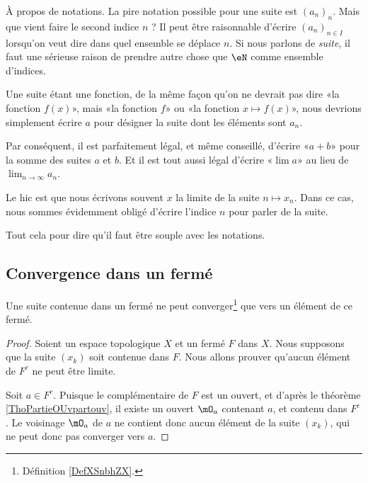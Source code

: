 \begin{normaltext}
	À propos de notations. La pire notation possible pour une suite est \( (a_n)_n\). Mais que vient faire le second indice \( n\) ? Il peut être raisonnable d'écrire \( (a_n)_{n\in I}\) lorsqu'on veut dire dans quel ensemble se déplace \( n\). Si nous parlons de \emph{suite}, il faut une sérieuse raison de prendre autre chose que \( \eN\) comme ensemble d'indices.

	Une suite étant une fonction, de la même façon qu'on ne devrait pas dire «la fonction \( f(x)\)», mais «la fonction \( f\)» ou «la fonction \( x\mapsto f(x)\)», nous devrions simplement écrire \( a\) pour désigner la suite dont les éléments sont \( a_n\).

	Par conséquent, il est parfaitement légal, et même conseillé, d'écrire «\( a+b\)» pour la somme des suites \( a\) et \( b\). Et il est tout aussi légal d'écrire «\( \lim a\)» au lieu de \( \lim_{n\to \infty} a_n\).

	Le hic est que nous écrivons souvent \( x\) la limite de la suite \( n\mapsto x_n\). Dans ce cas, nous sommes évidemment obligé d'écrire l'indice \( n\) pour parler de la suite.

	Tout cela pour dire qu'il faut être souple avec les notations.
\end{normaltext}

\subsection{Convergence dans un fermé}

\begin{proposition}      \label{PROPooBBNSooCjrtRb}
	Une suite contenue dans un fermé ne peut converger\footnote{Définition \ref{DefXSnbhZX}.} que vers un élément de ce fermé.
\end{proposition}

\begin{proof}
	Soient un espace topologique \( X\) et un fermé \( F\) dans \( X\). Nous supposons que la suite \( (x_k)\) soit contenue dans \( F\). Nous allons prouver qu'aucun élément de \( F^c\) ne peut être limite.

	Soit \( a \in F^c\). Puisque le complémentaire de \( F\) est un ouvert, et d'après le théorème \ref{ThoPartieOUvpartouv}, il existe un ouvert \( \mO_a\) contenant \( a\), et contenu dans \( F^c\). Le voisinage \( \mO_a\) de \( a\) ne contient donc aucun élément de la suite \( (x_k)\), qui ne peut donc pas converger vers \( a\).
\end{proof}

